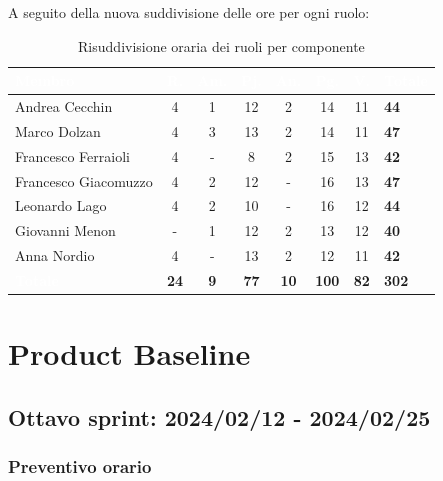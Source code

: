 \setlength{\tabcolsep}{10pt}
\renewcommand{\arraystretch}{1.4}
\noindent A seguito della nuova suddivisione delle ore per ogni ruolo:
\begin{table}[h!]
    \centering
    \begin{tabularx}{\textwidth}{| l | c | c | c | c | c | c | X |}
        \hline
        \rowcolor{headerrow} \textbf{\textcolor{white}{Membro}} & \textbf{\textcolor{white}{R.}} & \textbf{\textcolor{white}{Am.}} & \textbf{\textcolor{white}{Pj.}} & \textbf{\textcolor{white}{An.}} & \textbf{\textcolor{white}{Pg.}} & \textbf{\textcolor{white}{V.}}&\textbf{\textcolor{white}{Totale}} \\
        \hline
        Andrea Cecchin & 4 & 1 & 12 & 2 & 14 & 11 & \textbf{44}\\
        \hline
        Marco Dolzan & 4 & 3 & 13 & 2 & 14 & 11 & \textbf{47}\\
        \hline
        Francesco Ferraioli & 4 & - & 8 & 2 & 15 & 13 &  \textbf{42}\\
        \hline  
        Francesco Giacomuzzo & 4 & 2 & 12 & - & 16 & 13 & \textbf{47}\\
        \hline
        Leonardo Lago & 4 & 2 & 10 & - & 16 & 12 &  \textbf{44}\\
        \hline
        Giovanni Menon & - & 1 & 12 & 2 & 13 & 12 &  \textbf{40}\\
        \hline
        Anna Nordio & 4 & - & 13 & 2 & 12 & 11 &  \textbf{42}\\
        \hline
    \cellcolor{headerrow} \textbf{\textcolor{white}{Totale}} & \textbf{24} & \textbf{9} & \textbf{77} & \textbf{10} & \textbf{100} & \textbf{82} & \textbf{302}\\
        \hline
    \end{tabularx} 
    \caption{Risuddivisione oraria dei ruoli per componente}
    \label{tab:risuddivisione}
\end{table}
\newpage

\section{Product Baseline}

\subsection{Ottavo sprint: 2024/02/12 - 2024/02/25}
\subsubsection{Preventivo orario}

